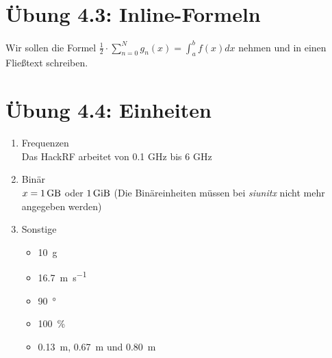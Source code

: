 \documentclass{article}
\begin{document}
\section*{Übung 4.3: Inline-Formeln}
Wir sollen die Formel \( \frac{1}{2} \cdot \sum^{N}_{n=0} g_{n}(x) = \int^{b}_{a} f(x) dx\) nehmen und in einen Fließtext schreiben.

\section*{Übung 4.4: Einheiten}
\begin{enumerate}[label=\alph*)]
    \item Frequenzen \\
          Das HackRF arbeitet von 0.1 \si{\giga\hertz} bis 6 \si{\giga\hertz}

    \item Binär \\
          $x = \SI{1}{\giga\byte}$ oder $ \SI{1}{\gibi\byte}$ \small({Die Binäreinheiten müssen bei \emph{siunitx} nicht mehr angegeben werden})

    \item Sonstige
          \begin{itemize}
              \item \SI{10}{\gram}
              \item \SI{16.7}{\metre\per\s}
              \item \SI{90}{\degree}
              \item \SI{100}{\percent}
              \item \SI{0.13}{\metre}, \SI{0.67}{\metre} und \SI{0.80}{\metre}
          \end{itemize}
\end{enumerate}
\end{document}
